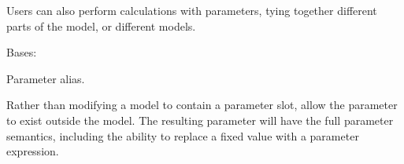 \documentclass[letterpaper,10pt,english]{sphinxmanual}
\begin{document}
Users can also perform calculations with parameters, tying together different
parts of the model, or different models.

\begin{fulllineitems}
\label{api/mystic.parameter:refl1d.mystic.parameter.Alias}
Bases: 

Parameter alias.

Rather than modifying a model to contain a parameter slot,
allow the parameter to exist outside the model. The resulting
parameter will have the full parameter semantics, including
the ability to replace a fixed value with a parameter expression.

\begin{fulllineitems}
\label{api/mystic.parameter:refl1d.mystic.parameter.Alias.parameters}
\end{fulllineitems}


\begin{fulllineitems}
\label{api/mystic.parameter:refl1d.mystic.parameter.Alias.update}
\end{fulllineitems}


\end{fulllineitems}

\end{document}
